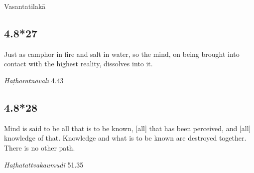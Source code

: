 \begin{ekdosis}


\begin{metre}[hp04_008_26]
Vasantatilakā
\end{metre}

\subsection*{4.8*27}
\begin{translation}[hp04_008_27]
Just as camphor in fire and salt in water, so the mind, on being brought into contact with the highest reality, dissolves into it.
\end{translation}


\begin{testimonia}[hp04_008_27]
\emph{Haṭharatnāvalī} 4.43
\begin{versinnote}
\end{versinnote}
\end{testimonia}


\subsection*{4.8*28}
\begin{translation}[hp04_008_28]
Mind is said to be all that is to be known, [all] that has been perceived, and [all] knowledge of that. Knowledge and what is to be known are destroyed together. There is no other path.
\end{translation}


\begin{testimonia}[hp04_008_28]
\emph{Haṭhatattvakaumudī} 51.35
\begin{versinnote}
\end{versinnote}
\end{testimonia}


\end{ekdosis}
